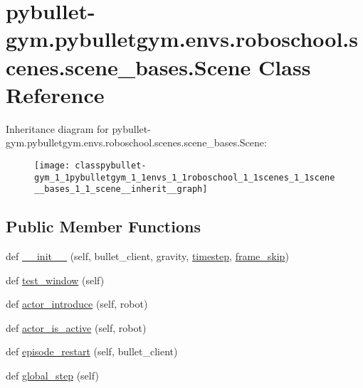\hypertarget{classpybullet-gym_1_1pybulletgym_1_1envs_1_1roboschool_1_1scenes_1_1scene__bases_1_1_scene}{}\section{pybullet-\/gym.pybulletgym.\+envs.\+roboschool.\+scenes.\+scene\+\_\+bases.\+Scene Class Reference}
\label{classpybullet-gym_1_1pybulletgym_1_1envs_1_1roboschool_1_1scenes_1_1scene__bases_1_1_scene}


Inheritance diagram for pybullet-\/gym.pybulletgym.\+envs.\+roboschool.\+scenes.\+scene\+\_\+bases.\+Scene\+:
\nopagebreak
\begin{figure}[H]
\begin{center}
\leavevmode
\texttt{[image: classpybullet-gym\_1\_1pybulletgym\_1\_1envs\_1\_1roboschool\_1\_1scenes\_1\_1scene\_\_bases\_1\_1\_scene\_\_inherit\_\_graph]}
\end{center}
\end{figure}
\subsection*{Public Member Functions}
\begin{DoxyCompactItemize}
\item 
def \hyperlink{classpybullet-gym_1_1pybulletgym_1_1envs_1_1roboschool_1_1scenes_1_1scene__bases_1_1_scene_a7cd398dcfc3b5a5929cae70fdad652a9}{\+\_\+\+\_\+init\+\_\+\+\_\+} (self, bullet\+\_\+client, gravity, \hyperlink{classpybullet-gym_1_1pybulletgym_1_1envs_1_1roboschool_1_1scenes_1_1scene__bases_1_1_scene_a1997157029b12afc5cb924a639af5df3}{timestep}, \hyperlink{classpybullet-gym_1_1pybulletgym_1_1envs_1_1roboschool_1_1scenes_1_1scene__bases_1_1_scene_a63b6f349e603e5ad932f74fdcdb90ce9}{frame\+\_\+skip})
\item 
def \hyperlink{classpybullet-gym_1_1pybulletgym_1_1envs_1_1roboschool_1_1scenes_1_1scene__bases_1_1_scene_a33be14457548dbc111d1716e9b2cb625}{test\+\_\+window} (self)
\item 
def \hyperlink{classpybullet-gym_1_1pybulletgym_1_1envs_1_1roboschool_1_1scenes_1_1scene__bases_1_1_scene_a477894ba0c55647ca3dd062ddd054dd0}{actor\+\_\+introduce} (self, robot)
\item 
def \hyperlink{classpybullet-gym_1_1pybulletgym_1_1envs_1_1roboschool_1_1scenes_1_1scene__bases_1_1_scene_a572fc8328cf71c84760b806e0710f446}{actor\+\_\+is\+\_\+active} (self, robot)
\item 
def \hyperlink{classpybullet-gym_1_1pybulletgym_1_1envs_1_1roboschool_1_1scenes_1_1scene__bases_1_1_scene_ae6a4048049f6525169d9aa2fdd6abad0}{episode\+\_\+restart} (self, bullet\+\_\+client)
\item 
def \hyperlink{classpybullet-gym_1_1pybulletgym_1_1envs_1_1roboschool_1_1scenes_1_1scene__bases_1_1_scene_aaeecf71956aa03a91a13cb403a88b33c}{global\+\_\+step} (self)
\end{DoxyCompactItemize}
